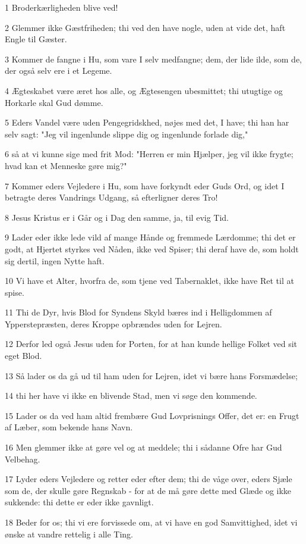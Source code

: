 \par 1 Broderkærligheden blive ved!
\par 2 Glemmer ikke Gæstfriheden; thi ved den have nogle, uden at vide det, haft Engle til Gæster.
\par 3 Kommer de fangne i Hu, som vare I selv medfangne; dem, der lide ilde, som de, der også selv ere i et Legeme.
\par 4 Ægteskabet være æret hos alle, og Ægtesengen ubesmittet; thi utugtige og Horkarle skal Gud dømme.
\par 5 Eders Vandel være uden Pengegridskhed, nøjes med det, I have; thi han har selv sagt: "Jeg vil ingenlunde slippe dig og ingenlunde forlade dig,"
\par 6 så at vi kunne sige med frit Mod: "Herren er min Hjælper, jeg vil ikke frygte; hvad kan et Menneske gøre mig?"
\par 7 Kommer eders Vejledere i Hu, som have forkyndt eder Guds Ord, og idet I betragte deres Vandrings Udgang, så efterligner deres Tro!
\par 8 Jesus Kristus er i Går og i Dag den samme, ja, til evig Tid.
\par 9 Lader eder ikke lede vild af mange Hånde og fremmede Lærdomme; thi det er godt, at Hjertet styrkes ved Nåden, ikke ved Spiser; thi deraf have de, som holdt sig dertil, ingen Nytte haft.
\par 10 Vi have et Alter, hvorfra de, som tjene ved Tabernaklet, ikke have Ret til at spise.
\par 11 Thi de Dyr, hvis Blod for Syndens Skyld bæres ind i Helligdommen af Ypperstepræsten, deres Kroppe opbrændes uden for Lejren.
\par 12 Derfor led også Jesus uden for Porten, for at han kunde hellige Folket ved sit eget Blod.
\par 13 Så lader os da gå ud til ham uden for Lejren, idet vi bære hans Forsmædelse;
\par 14 thi her have vi ikke en blivende Stad, men vi søge den kommende.
\par 15 Lader os da ved ham altid frembære Gud Lovprisnings Offer, det er: en Frugt af Læber, som bekende hans Navn.
\par 16 Men glemmer ikke at gøre vel og at meddele; thi i sådanne Ofre har Gud Velbehag.
\par 17 Lyder eders Vejledere og retter eder efter dem; thi de våge over, eders Sjæle som de, der skulle gøre Regnskab - for at de må gøre dette med Glæde og ikke sukkende: thi dette er eder ikke gavnligt.
\par 18 Beder for os; thi vi ere forvissede om, at vi have en god Samvittighed, idet vi ønske at vandre rettelig i alle Ting.
